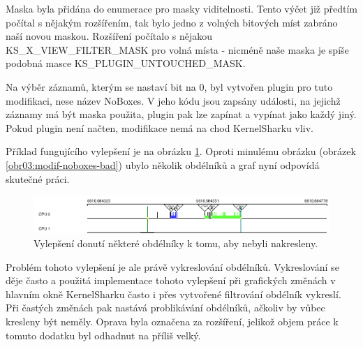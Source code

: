 Maska byla přidána do enumerace pro masky viditelnosti. Tento výčet již předtím počítal s nějakým rozšířením, tak bylo jedno z volných bitových míst zabráno naší novou maskou. Rozšíření počítalo s nějakou KS\_X\_VIEW\_FILTER\_MASK pro volná místa - nicméně naše maska je spíše podobná masce KS\_PLUGIN\_UNTOUCHED\_MASK.

Na výběr záznamů, kterým se nastaví bit na 0, byl vytvořen plugin pro tuto modifikaci, nese název NoBoxes. V jeho kódu jsou zapsány události, na jejichž záznamy má být maska použita, plugin pak lze zapínat a vypínat jako každý jiný. Pokud plugin není načten, modifikace nemá na chod KernelSharku vliv.

Příklad fungujícího vylepšení je na obrázku \ref{obr04:modif-noboxes-good}. Oproti minulému obrázku (obrázek \ref{obr03:modif-noboxes-bad}) ubylo několik obdélníků a graf nyní odpovídá skutečné práci.

\begin{figure}[p]\centering
    \includegraphics[width=140mm]{img/modif-noboxes-good}
    \caption{Vylepšení donutí některé obdélníky k tomu, aby nebyli nakresleny.}
    \label{obr04:modif-noboxes-good}
\end{figure}

Problém tohoto vylepšení je ale právě vykreslování obdélníků. Vykreslování se děje často a použitá implementace tohoto vylepšení při grafických změnách v hlavním okně KernelSharku často i přes vytvořené filtrování obdélník vykreslí. Při častých změnách pak nastává problikávání obdélníků, ačkoliv by vůbec kresleny být neměly. Oprava byla označena za rozšíření, jelikož objem práce k tomuto dodatku byl odhadnut na příliš velký.